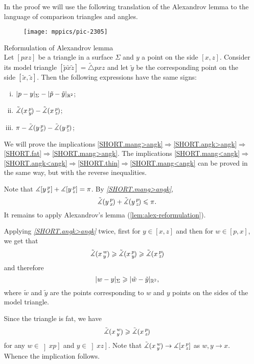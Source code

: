 In the proof we will use the following translation of the Alexandrov lemma to the language of comparison triangles and angles.

\begin{wrapfigure}{r}{25mm}
\vskip-0mm
\centering
\texttt{[image: mppics/pic-2305]}
\end{wrapfigure}

\begin{thm}{Reformulation of Alexandrov lemma}\label{lem:alex-reformulation}\\
Let $[pxz]$ be a triangle in a surface $\Sigma$ and 
 $y$ a point on the side $[x,z]$.
Consider its model triangle $[\tilde p\tilde x\tilde z]=\tilde\triangle pxz$ and let $\tilde y$ be the corresponding point on the side $[\tilde x,\tilde z]$.
Then the following expressions have the same signs:
\begin{enumerate}[(i)]
 \item $\dist{p}{y}\Sigma-\dist{\tilde p}{\tilde y}{\mathbb{R}^2}$;
 \item $\tilde\measuredangle(x\,{}^{p}_{y}\hspace{-0.2ex})-\tilde\measuredangle(x\,{}^{p}_{z}\hspace{-0.2ex})$;
 \item $\pi-\tilde\measuredangle(y\,{}^{p}_{x}\hspace{-0.2ex})-\tilde\measuredangle(y\,{}^{p}_{z}\hspace{-0.2ex})$;
\end{enumerate}
\end{thm}

We will prove the implications \ref{SHORT.mang>angk}$\Rightarrow$\ref{SHORT.angk>angk}$\Rightarrow$\ref{SHORT.fat}$\Rightarrow$\ref{SHORT.mang>angk}.
The implications \ref{SHORT.mang<angk}$\Rightarrow$\ref{SHORT.angk<angk}$\Rightarrow$\ref{SHORT.thin}$\Rightarrow$\ref{SHORT.mang<angk} can be proved in the same way, but with the reverse inequalities.

Note that $\measuredangle[y\,{}^{p}_{x}]+\measuredangle[y\,{}^{p}_{z}]=\pi$.
By \textit{\ref{SHORT.mang>angk}}, 
\[\tilde\measuredangle(y\,{}^{p}_{x}\hspace{-0.2ex})+\tilde\measuredangle(y\,{}^{p}_{z}\hspace{-0.2ex})\leqslant \pi.\]
It remains to apply Alexandrov's lemma (\ref{lem:alex-reformulation}).


Applying \textit{\ref{SHORT.angk>angk}} twice, first for $y\in [x,z]$ and then for $w\in [p,x]$, we get that
\[\tilde\measuredangle(x\,{}^{w}_{y}\hspace{-0.2ex}) \geqslant \tilde\measuredangle(x\,{}^{p}_{y}\hspace{-0.2ex}) \geqslant \tilde\measuredangle(x\,{}^{p}_{z}\hspace{-0.2ex})\]
and therefore
\[\dist{w}{y}\Sigma\ge \dist{\tilde w}{\tilde y}{\mathbb{R}^2},\]
where $\tilde w$ and $\tilde y$ are the points corresponding to $w$ and $y$ points on the sides of the model triangle. 

Since the triangle is fat, we have 
\[\tilde\measuredangle(x\,{}^{w}_{y}\hspace{-0.2ex}) \geqslant \tilde\measuredangle(x\,{}^{p}_{z}\hspace{-0.2ex})\]
for any $w\in \left]xp\right]$ and $y\in \left]xz\right]$.
Note that $\tilde\measuredangle(x\,{}^{w}_{y}\hspace{-0.2ex})\to \measuredangle[x\,{}^{p}_{z}]$ as $w,y\to x$.
Whence the implication follows.
\qeds

